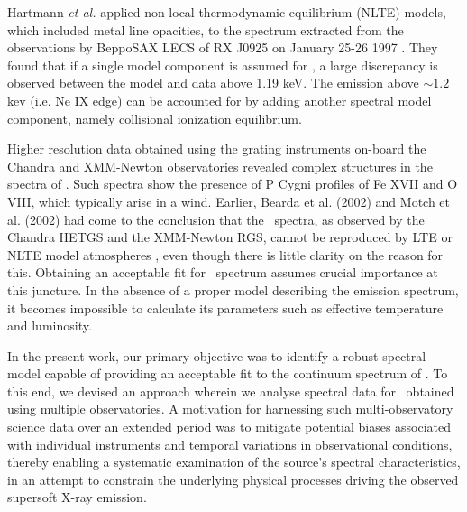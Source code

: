 	Hartmann \textit{et al.} applied non-local thermodynamic equilibrium (NLTE) models, which included metal line opacities, to the spectrum extracted from the observations by BeppoSAX LECS of RX J0925 on January 25-26 1997 \cite{hartmann1999constraining}. They found that if a single model component is assumed for \source, a large discrepancy is observed between the model and data above 1.19 keV. The emission above $\sim 1.2$ kev (i.e. Ne IX edge) can be accounted for by adding another spectral model component, namely collisional ionization equilibrium.
	
	Higher resolution data obtained using the grating instruments on-board the Chandra and XMM-Newton observatories revealed complex structures in the spectra of \source. Such spectra show the presence of P Cygni profiles of Fe XVII and O VIII, which typically arise in a wind. Earlier, Bearda et al. (2002) and Motch et al. (2002) had come to the conclusion that the \source\ spectra, as observed by the Chandra HETGS and the XMM-Newton RGS, cannot be reproduced by LTE or NLTE model atmospheres \cite{beardaChandra2002AA,motchXmmNewton2002AA}, even though there is little clarity on the reason for this. Obtaining an acceptable fit for \source\ spectrum assumes crucial importance at this juncture. In the absence of a proper model describing the emission spectrum, it becomes impossible to calculate its parameters such as effective temperature and luminosity.
	
	In the present work, our primary objective was to identify a robust spectral model capable of providing an acceptable fit to the continuum spectrum of \source. To this end, we devised an approach wherein we analyse spectral data for \source\ obtained using multiple observatories. A motivation for harnessing such multi-observatory science data over an extended period was to mitigate potential biases associated with individual instruments and temporal variations in observational conditions, thereby enabling a systematic examination of the source's spectral characteristics, in an attempt to constrain the underlying physical processes driving the observed supersoft X-ray emission.
	
